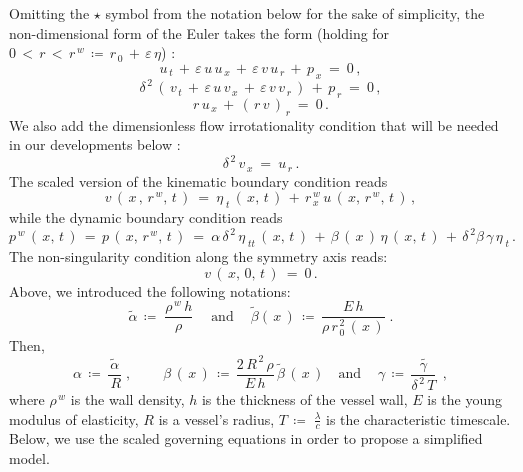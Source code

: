 \documentclass[alpha-refs, 12pt]{wiley-article}
\newcommand{\eps}{\varepsilon}
\begin{document}
Omitting the $\star$ symbol from the notation below for the sake of simplicity, the non-dimensional form of the Euler takes the form (holding for $0\, < \,r\, <\, r^{\,w}\,\coloneqq\,r_{\,0}\,+\,\eps\,\eta$) \cite{Mitsotakis2018}:
\begin{equation}\label{eq:momentx}
  u_{\,t}\,+\,\eps\,u\,u_{\,x}\,+\,\eps\,v\, u_{\,r}\,+\,p_{\,x}\ =\ 0\,,
\end{equation}
\begin{equation}\label{eq:momenty}
  \delta^{\,2}\,(\,v_{\,t}\,+\,\eps\,u\,v_{\,x}\,+\,\eps\,v \,v_{\,r}\,)\,+\,p_{\,r}\ =\ 0\,,
\end{equation}
\begin{equation}\label{eq:cont}
  r\,u_{\,x}\,+\,(\,r\,v\,)_{\,r}\ =\ 0\,.
\end{equation}
We also add the dimensionless flow irrotationality condition that will be needed in our developments below \cite{Landau1987}:
\begin{equation}\label{eq:irr}
  \delta^{\,2}\,v_{\,x}\ =\ u_{\,r}\,.
\end{equation}
The scaled version of the kinematic boundary condition reads
\begin{equation}\label{eq:kin}
  v\,(\,x\,,\,r^{\,w},\,t\,)\ =\ \eta_{\;t}\,(\,x,\,t\,)\,+\,r_{\,x}^{\,w}\,u\,(\,x,\,r^{\,w},\,t\,)\,,
\end{equation}
while the dynamic boundary condition reads
\begin{equation}\label{eq:dyn}
  p^{\,w}\,(\,x,\,t\,)\,=\,p\,(\,x,\,r^{\,w},\,t\,)\ =\ \alpha\,\delta^{\,2}\,\eta_{\;tt}\,(\,x,\,t\,)\,+\,\beta\,(\,x\,)\,\eta\,(\,x,\,t\,)\,+\,\delta^{\,2}\beta\,\gamma\,\eta_{\;t}\,.
\end{equation}
The non-singularity condition along the symmetry axis reads:
\begin{equation}\label{eq:zero}
  v\,(\,x,\,0,\,t\,)\ =\ 0\,.
\end{equation}
Above, we introduced the following notations:
\begin{equation*}
  \tilde{\alpha}\,\coloneqq\;\frac{\rho^{\,w}\,h}{\rho}\; \quad \text{and} \ \quad \tilde{\beta}(\,x\,)\,\coloneqq\, \frac{E\,h}{\rho\,r_{\,0}^{\,2}\,(\,x\,)}\;. 
\end{equation*}
Then,
\begin{equation*}
  \alpha\,\coloneqq\,\frac{\tilde{\alpha}}{\,R}\;, \quad \ \quad \beta\,(\,x\,)\,\coloneqq\,\frac{2\,R^{\,2}\,\rho}{E\,h}\,\tilde{\beta}\,(\,x\,) \quad \text{and} \ \quad \gamma\,\coloneqq\,\tilde{\frac{\gamma }{\delta^{\,2}\,T}\;}\,,
\end{equation*}
where $\rho^{\,w}$ is the wall density, $h$ is the thickness of the vessel wall, $E$ is the young modulus of elasticity, $R$ is a vessel's radius, $T\, \coloneqq \;\displaystyle\frac{\lambda}{c}$ is the characteristic timescale. Below, we use the scaled governing equations in order to propose a simplified model.
\end{document}
